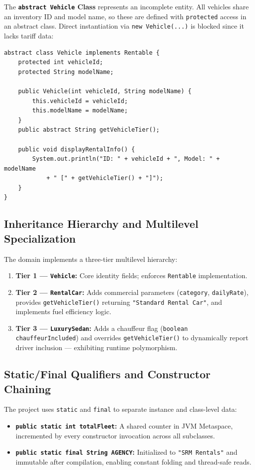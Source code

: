\documentclass[11pt,a4paper]{article}
\begin{document}
The \textbf{\texttt{abstract Vehicle} Class} represents an incomplete entity. All vehicles share an inventory ID and model name, so these are defined with \texttt{protected} access in an abstract class. Direct instantiation via \texttt{new Vehicle(...)} is blocked since it lacks tariff data:
\begin{lstlisting}[caption={Abstract Vehicle Base Class}]
abstract class Vehicle implements Rentable {
    protected int vehicleId;
    protected String modelName;

    public Vehicle(int vehicleId, String modelName) {
        this.vehicleId = vehicleId;
        this.modelName = modelName;
    }
    public abstract String getVehicleTier();

    public void displayRentalInfo() {
        System.out.println("ID: " + vehicleId + ", Model: " + modelName
            + " [" + getVehicleTier() + "]");
    }
}
\end{lstlisting}

\subsection{Inheritance Hierarchy and Multilevel Specialization}
The domain implements a three-tier multilevel hierarchy:
\begin{enumerate}
    \item \textbf{Tier 1 --- \texttt{Vehicle}:} Core identity fields; enforces \texttt{Rentable} implementation.
    \item \textbf{Tier 2 --- \texttt{RentalCar}:} Adds commercial parameters (\texttt{category}, \texttt{dailyRate}), provides \texttt{getVehicleTier()} returning \texttt{"Standard Rental Car"}, and implements fuel efficiency logic.
    \item \textbf{Tier 3 --- \texttt{LuxurySedan}:} Adds a chauffeur flag (\texttt{boolean chauffeurIncluded}) and overrides \texttt{getVehicleTier()} to dynamically report driver inclusion --- exhibiting runtime polymorphism.
\end{enumerate}

\subsection{Static/Final Qualifiers and Constructor Chaining}
The project uses \texttt{static} and \texttt{final} to separate instance and class-level data:
\begin{itemize}
    \item \textbf{\texttt{public static int totalFleet}:} A shared counter in JVM Metaspace, incremented by every constructor invocation across all subclasses.
    \item \textbf{\texttt{public static final String AGENCY}:} Initialized to \texttt{"SRM Rentals"} and immutable after compilation, enabling constant folding and thread-safe reads.
\end{itemize}
\end{document}
